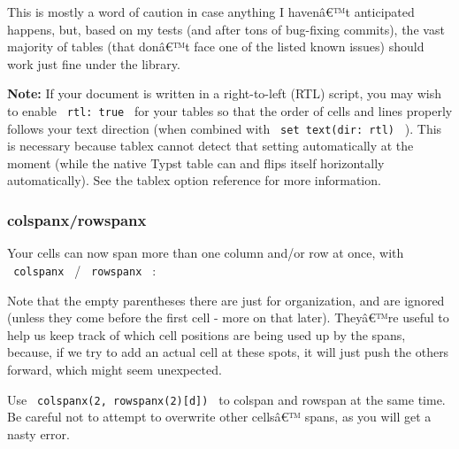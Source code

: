 This is mostly a word of caution in case anything I havenâ€™t
anticipated happens, but, based on my tests (and after tons of
bug-fixing commits), the vast majority of tables (that donâ€™t face one
of the listed known issues) should work just fine under the library.

\textbf{Note:} If your document is written in a right-to-left (RTL)
script, you may wish to enable \texttt{\ rtl:\ true\ } for your tables
so that the order of cells and lines properly follows your text
direction (when combined with \texttt{\ set\ text(dir:\ rtl)\ } ). This
is necessary because tablex cannot detect that setting automatically at
the moment (while the native Typst table can and flips itself
horizontally automatically). See the tablex option reference for more
information.

\subsubsection{colspanx/rowspanx}\label{colspanxrowspanx}

Your cells can now span more than one column and/or row at once, with
\texttt{\ colspanx\ } / \texttt{\ rowspanx\ } :

\begin{Shaded}
\begin{Highlighting}[]

\NormalTok{  [f], (),             [g]}
\NormalTok{)}
\end{Highlighting}
\end{Shaded}


Note that the empty parentheses there are just for organization, and are
ignored (unless they come before the first cell - more on that later).
Theyâ€™re useful to help us keep track of which cell positions are being
used up by the spans, because, if we try to add an actual cell at these
spots, it will just push the others forward, which might seem
unexpected.

Use \texttt{\ colspanx(2,\ rowspanx(2){[}d{]})\ } to colspan and rowspan
at the same time. Be careful not to attempt to overwrite other cellsâ€™
spans, as you will get a nasty error.

